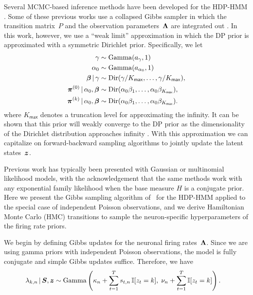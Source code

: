 Several MCMC-based inference methods have been developed for the
HDP-HMM \citep{Teh06,van08}. Some of these previous works use a
collapsed Gibbs sampler in which the transition matrix~$P$ and the
observation parameters~$\boldsymbol{\Lambda}$ are integrated out
\citep{Teh06,van08}. In this work, however, we use a ``weak limit''
approximation in which the DP prior is approximated with a symmetric
Dirichlet prior. Specifically, we let
\begin{align}
\label{eq:hdphmm_trans}
\gamma &\sim \mathrm{Gamma}(a_\gamma, 1) \\
\nonumber \alpha_0 &\sim \mathrm{Gamma}(a_{\alpha_0}, 1) \\
\nonumber \boldsymbol{\beta} \,|\, \gamma &\sim \mathrm{Dir}(\gamma/K_{\mathsf{max}}, \ldots, \gamma/K_{\mathsf{max}}), \\
\nonumber \boldsymbol{\pi}^{(0)} \,|\, \alpha_0, \boldsymbol{\beta} &\sim \mathrm{Dir}(\alpha_0 \beta_1, \ldots, \alpha_0 \beta_{K_{\mathsf{max}}}), \\
\nonumber \boldsymbol{\pi}^{(k)} \,|\, \alpha_0, \boldsymbol{\beta} &\sim \mathrm{Dir}(\alpha_0 \beta_1, \ldots, \alpha_0 \beta_{K_{\mathsf{max}}}).
\end{align}
where $K_{\mathsf{max}}$ denotes a truncation level for approximating the infinity.  It can be
shown that this prior will weakly converge to the DP prior as the
dimensionality of the Dirichlet distribution approaches infinity
\citep{Johnson14, Ishwaran02}. With this approximation we can
capitalize on forward-backward sampling algorithms to jointly update
the latent states~$\boldsymbol{z}$.

Previous work has typically been presented with Gaussian or
multinomial likelihood models, with the acknowledgement that the same
methods work with any exponential family likelihood when the base
measure $H$ is a conjugate prior.  Here we present the Gibbs sampling
algorithm of~\citep{Teh06} for the HDP-HMM applied to the special case
of independent Poisson observations, and we derive Hamiltonian Monte
Carlo (HMC)  \citep{Neal10} transitions to sample the neuron-specific hyperparameters of
the firing rate priors.

We begin by defining Gibbs updates for the neuronal firing
rates~$\boldsymbol{\Lambda}$. Since we are using gamma priors with independent
Poisson observations, the model is fully conjugate and simple Gibbs
updates suffice. Therefore, we have
\begin{align*}
\lambda_{k,n} \,|\, \boldsymbol{S}, \boldsymbol{z} 
  &\sim \mathrm{Gamma} \left(
    \kappa_n + \sum_{t=1}^T s_{t,n} \, \mathbb{I}[z_t=k], \; 
    \nu_n + \sum_{t=1}^T \mathbb{I}[z_t=k]
    \right).
\end{align*}

